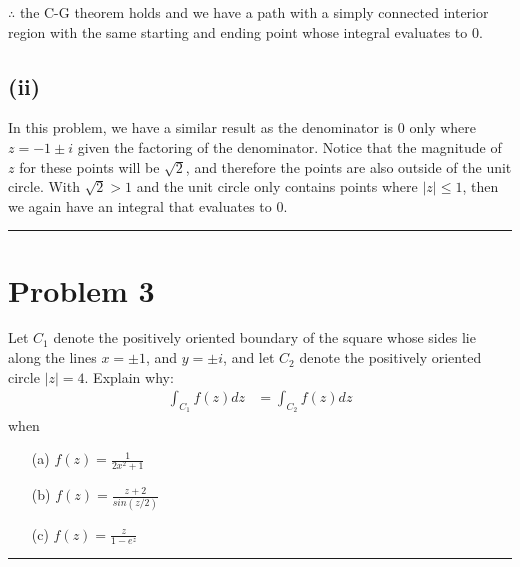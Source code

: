 \documentclass{article}
\begin{document}
$\therefore$ the C-G theorem holds and we have a path with a simply connected interior region with the same starting and ending point whose integral evaluates to $0$. 

\subsection*{(ii)}
In this problem, we have a similar result as the denominator is $0$ only where $z = -1 \pm i$ given the factoring of the denominator. Notice that the magnitude of $z$ for these points will be $\sqrt{2}$, and therefore the points are also outside of the unit circle. With $\sqrt{2} > 1$ and the unit circle only contains points where $|z| \leq 1$, then we again have an integral that evaluates to $0$. 

\vspace{0.5cm} %

\hrule

\newpage
\section*{Problem 3}
Let $C_1$ denote the positively oriented boundary of the square whose sides lie along the lines $x = \pm 1$, and $y=\pm i$, and let $C_2$ denote the positively oriented circle $|z| = 4$. Explain why:
\begin{align*}
  \int_{C_1}f(z)dz &= \int_{C_2}f(z)dz
\end{align*}
when
\begin{enumerate}
  \item[(a)] $f(z) = \frac{1}{2x^2+1}$
  \item[(b)] $f(z) = \frac{z+2}{sin(z/2)}$
  \item[(c)] $f(z) = \frac{z}{1-e^z}$
\end{enumerate}

\vspace{0.5cm} %

\hrule

% 
\end{document}
